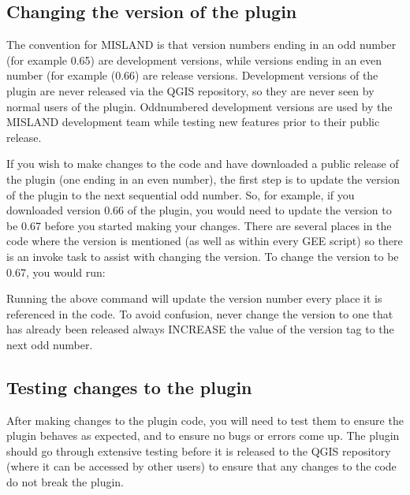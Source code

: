 \documentclass[letterpaper,10pt,english]{sphinxmanual}
\begin{document}
\subsection{Changing the version of the plugin}
\label{\detokenize{Qgis_Plugin/plugin_development:changing-the-version-of-the-plugin}}
\sphinxAtStartPar
The convention for MISLAND is that version numbers ending in an odd number
(for example 0.65) are development versions, while versions ending in an even
number (for example (0.66) are release versions. Development versions of the
plugin are never released via the QGIS repository, so they are never seen by
normal users of the plugin. Odd\sphinxhyphen{}numbered development versions are used by the
MISLAND development team while testing new features prior to their public
release.

\sphinxAtStartPar
If you wish to make changes to the code and have downloaded a public release of
the plugin (one ending in an even number), the first step is to update the
version of the plugin to the next sequential odd number. So, for example, if
you downloaded version 0.66 of the plugin, you would need to update the version
to be 0.67 before you started making your changes. There are several places in
the code where the version is mentioned (as well as within every GEE script) so
there is an invoke task to assist with changing the version. To change the
version to be 0.67, you would run:

\begin{sphinxVerbatim}[commandchars=\\\{\}]
   
\end{sphinxVerbatim}

\sphinxAtStartPar
Running the above command will update the version number every place it is
referenced in the code. To avoid confusion, never change the version to one
that has already been released \sphinxhyphen{} always INCREASE the value of the version tag
to the next odd number.


\subsection{Testing changes to the plugin}
\label{\detokenize{Qgis_Plugin/plugin_development:testing-changes-to-the-plugin}}
\sphinxAtStartPar
After making changes to the plugin code, you will need to test them to ensure
the plugin behaves as expected, and to ensure no bugs or errors come up. The
plugin should go through extensive testing before it is released to the QGIS
repository (where it can be accessed by other users) to ensure that any changes
to the code do not break the plugin.
\end{document}
